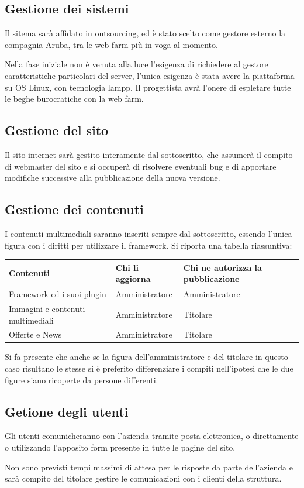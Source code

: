 \documentclass[a4paper,12pt,hidelinks]{report}
\begin{document}
  \subsection{Gestione dei sistemi}
  Il sitema sarà affidato in outsourcing, ed è stato scelto come gestore esterno la compagnia Aruba, tra le web farm più in voga al momento.
  \par Nella fase iniziale non è venuta alla luce l'esigenza di richiedere al gestore caratteristiche particolari del server, l'unica esigenza è stata avere la piattaforma su OS Linux, con tecnologia lampp.
  Il progettista avrà l'onere di espletare tutte le beghe burocratiche con la web farm.
  
  \subsection{Gestione del sito}
  Il sito internet sarà gestito interamente dal sottoscritto, che assumerà il compito di webmaster del sito e si occuperà di risolvere eventuali bug e 
  di apportare modifiche successive alla pubblicazione della nuova versione.
  
  \subsection{Gestione dei contenuti}
  I contenuti multimediali saranno inseriti sempre dal sottoscritto, essendo l'unica figura con i diritti per utilizzare il framework.
  Si riporta una tabella riassuntiva:
  \begin{center}
    \begin{tabular}{||m{6cm}|m{3cm}|m{3cm}||}
      \hline
	\textbf{Contenuti} & \textbf{Chi li aggiorna} & \textbf{Chi ne autorizza la pubblicazione}\\
      \hline
	Framework ed i suoi plugin & Amministratore & Amministratore\\
      \hline
	Immagini e contenuti multimediali & Amministratore & Titolare\\
      \hline  
	Offerte e News & Amministratore & Titolare \\
      \hline
    \end{tabular}
  \end{center}
  \par Si fa presente che anche se la figura dell'amministratore e del titolare in questo caso risultano le stesse si è preferito differenziare i compiti nell'ipotesi
  che le due figure siano ricoperte da persone differenti.
  \subsection{Getione degli utenti}
  Gli utenti comunicheranno con l'azienda tramite posta elettronica, o direttamente o utilizzando l'apposito form presente in tutte le pagine del sito.
  \par Non sono previsti tempi massimi di attesa per le risposte da parte dell'azienda e sarà compito del titolare gestire le comunicazioni con i clienti della struttura.
\end{document}
